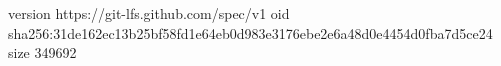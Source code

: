 version https://git-lfs.github.com/spec/v1
oid sha256:31de162ec13b25bf58fd1e64eb0d983e3176ebe2e6a48d0e4454d0fba7d5ce24
size 349692
